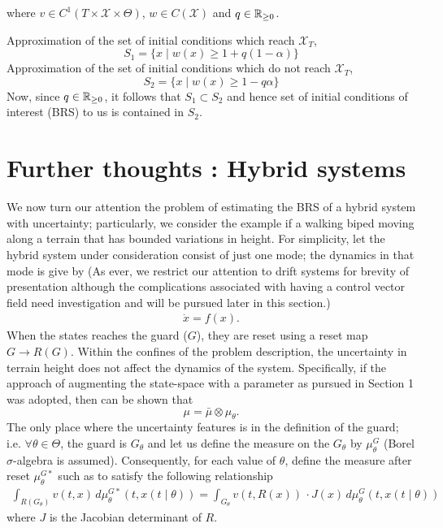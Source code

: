 \documentclass[10pt]{scrartcl}
\theoremstyle{remark}
\providecommand{\R}{\ensuremath \mathbb{R}}
\begin{document}
where $v\in C^1(T\times \mathcal X\times \Theta)$, $w\in C(\mathcal X)$ and $q\in \R_{\ge 0}$.\par
Approximation of the set of initial conditions which reach $\mathcal X_T$, 
$$S_1=\{x\mid w(x)\ge 1+q(1-\alpha)\}$$
Approximation of the set of initial conditions which do not reach $\mathcal X_T$, 
$$S_2=\{x\mid w(x)\ge 1-q\alpha\}$$
Now, since $q\in \R_{\ge 0}$, it follows that $S_1\subset S_2$ and hence set of initial conditions of interest (BRS) to us is contained in $S_2$.

\newpage

\section{Further thoughts : Hybrid systems}
We now turn our attention the problem of estimating the BRS of a hybrid system with uncertainty; particularly, we consider the example if a walking biped moving along a terrain that has bounded variations in height. For simplicity, let the hybrid system under consideration consist of just one mode; the dynamics in that mode is give by (As ever, we restrict our attention to drift systems for brevity of presentation although the complications associated with having a control vector field need investigation and will be pursued later in this section.)
\begin{align}
\dot x=f(x).
\end{align}
When the states reaches the guard ($G$), they are reset using a reset map $G\rightarrow R(G)$. Within the confines of the problem description, the uncertainty in terrain height does not affect the dynamics of the system. Specifically, if the approach of augmenting the state-space with a parameter as pursued in Section 1 was adopted, then can be shown that $$\mu=\bar\mu\otimes \mu_\theta.$$
The only place where the uncertainty features is in the definition of the guard; i.e. $\forall \theta\in \Theta$, the guard is $G_\theta$ and let us define the measure on the $G_\theta$ by $\mu^G_\theta$ (Borel $\sigma$-algebra is assumed). Consequently, for each value of $\theta$, define the measure after reset $\mu^{G*}_{\theta}$ such as to satisfy the following relationship
\begin{align}
	\int_{R(G_\theta)} v(t,x)\,d\mu_{\theta}^{G*}(t,x(t\mid \theta))=\int_{G_\theta}v(t,R(x))\,\cdot J(x)\,d\mu_\theta^G(t,x(t\mid \theta))
\end{align}
where $J$ is the Jacobian determinant of $R$.
\par
\end{document}
